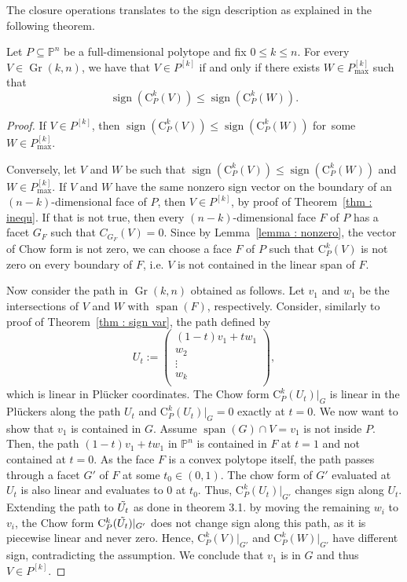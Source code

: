 \documentclass[english]{ourlematema}
\DeclareMathOperator{\Gr}{Gr}
\DeclareMathOperator{\spanv}{span}
\DeclareMathOperator{\sign}{sign}
\newcommand{\PP}{\mathbb{P}}
\newcommand{\Pk}{P^{[k]}}
\newcommand{\Pkmax}{P^{[k]}_{\max}}
\newcommand{\CPk}{\mathrm{C}_P^k}
\begin{document}
The closure operations translates to the sign description as explained in the following theorem.

\begin{prop}\label{thm : sign closure}
    Let $P\subseteq \PP^n$ be a full-dimensional polytope and fix $0\leq k \leq n$.
    For every $V\in \Gr(k,n)$, we have that $V\in \Pk$ if and only if there exists $W\in \Pkmax$ such that 
    \[ \sign(\CPk(V))\leq \sign(\CPk(W)). \]
\end{prop}
\begin{proof}
    If $V\in \Pk$, then $\sign(\CPk(V))\leq \sign(\CPk(W))$ for~some~$W\in\Pkmax$.

    Conversely, let $V$ and $W$ be such that $ \sign(\CPk(V))\leq \sign(\CPk(W))$ and $W\in\Pkmax$. If $V$ and $W$ have the same nonzero sign vector on the boundary of an $(n-k)$-dimensional face of $P$, then $V\in \Pk$, by proof of Theorem~\ref{thm : inequ}.
    If that is not true, then every $(n-k)$-dimensional face $F$ of $P$ has a facet $G_F$ such that $C_{G_F}(V)=0$. Since by Lemma~\ref{lemma : nonzero}, the vector of Chow form is not zero, we can choose a face $F$ of $P$ such that $\CPk(V)$ is not zero on every boundary of $F$, i.e. $V$ is not contained in the linear span of $F$.
    
    Now consider the path in $\Gr(k,n)$ obtained as follows. Let $v_1$ and $w_1$ be the intersections of $V$ and $W$ with $\spanv(F)$, respectively. Consider, similarly to proof of Theorem~\ref{thm : sign var}, the path defined by
     \[ U_t:=\begin{pmatrix}
        (1-t)v_1 + tw_1 \\
        w_2\\
        \vdots   \\
        w_{k} \\
        \end{pmatrix}, \]
    which is linear in Pl\"ucker coordinates. 
    The Chow form $\CPk(U_t)|_{G}$ is linear in the Pl\"uckers along the path $U_t$ and $\CPk(U_t)|_{G}=0$ exactly at $t=0$. 
     We now want to show that $v_1$ is contained in $G$.
     Assume $\spanv(G)\cap V = v_1$ is not inside $P$. Then, the path $ (1-t)v_1 + tw_1 $ in $\PP^n$ is contained in $F$ at $t=1$ and not contained at $t=0$. As the face $F$ is a convex polytope itself, the path passes through a facet $G'$ of $F$ at some $t_0 \in (0,1)$. 
     The chow form of $G'$ evaluated at $U_t$ is also linear and evaluates to $0$ at $t_0$. Thus, $\CPk(U_t)|_{G'}$ changes sign along $U_t$. 
     Extending the path to $\Tilde{U_t}$ as done in theorem 3.1. by moving the remaining $w_i$ to $v_i$, the Chow form $\CPk(\Tilde{U_t})|_{G'}$ does not change sign along this path, as it is piecewise linear and never zero. 
     Hence, $\CPk(V)|_{G'}$ and $\CPk(W)|_{G'}$ have different sign, contradicting the assumption.
     We conclude that $v_1$ is in $G$ and thus $V \in \Pk$.
\end{proof}
\end{document}
